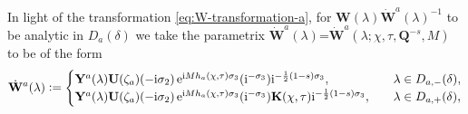 In light of the transformation \eqref{eq:W-transformation-a}, for $\mathbf{W}(\lambda)\dot{\mathbf{W}}^{a}(\lambda)^{-1}$ to be analytic in $D_{a}(\delta)$ we take the parametrix $\dot{\mathbf{W}}^{a}(\lambda)$=$\dot{\mathbf{W}}^{a}(\lambda;\chi,\tau,\mathbf{Q}^{-s},M)$ to be of the form
\begin{equation}
\dot{\mathbf{W}}^{a}(\lambda)\vcentcolon= \begin{cases}
\mathbf{Y}^{a}(\lambda) \mathbf{U}(\zeta_a)(-\mathrm{i} \sigma_2) \,\mathrm{e}^{\mathrm{i} M {h}_a(\chi,\tau)\sigma_3} (\mathrm{i}^{-\sigma_3})  \mathrm{i}^{-\frac{1}{2}(1-s)\sigma_3}, \quad & \lambda\in D_{a,-}(\delta),\\
\mathbf{Y}^{a}(\lambda) \mathbf{U}(\zeta_a)(-\mathrm{i} \sigma_2) \,\mathrm{e}^{\mathrm{i} M {h}_a(\chi,\tau)\sigma_3}(\mathrm{i}^{-\sigma_3})\mathbf{K}(\chi,\tau) \mathrm{i}^{-\frac{1}{2}(1-s)\sigma_3} , \quad & \lambda\in D_{a,+}(\delta),
\end{cases}
\label{eq:W-a}
\end{equation}
